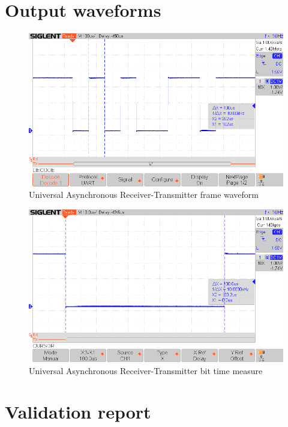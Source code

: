 \documentclass[10pt]{datasheet}
\begin{document}
\section{Output waveforms}

\begin{figure}
	\centering
	\includegraphics[width=1\textwidth]{SDS1}
	\caption{Universal Asynchronous Receiver-Transmitter frame waveform}
\end{figure}


\begin{figure}
	\centering
	\includegraphics[width=1\textwidth]{SDS2}
	\caption{Universal Asynchronous Receiver-Transmitter bit time measure}
\end{figure}

\newpage
\section{Validation report}

\end{document}
